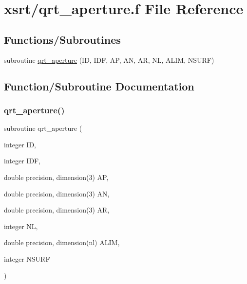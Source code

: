 \hypertarget{qrt__aperture_8f}{}\section{xsrt/qrt\+\_\+aperture.f File Reference}
\label{qrt__aperture_8f}
\subsection*{Functions/\+Subroutines}
\begin{DoxyCompactItemize}
\item 
subroutine \hyperlink{qrt__aperture_8f_ae89864e2a397bd30e4e68ee292796c3a}{qrt\+\_\+aperture} (ID, I\+DF, AP, AN, AR, NL, A\+L\+IM, N\+S\+U\+RF)
\end{DoxyCompactItemize}


\subsection{Function/\+Subroutine Documentation}
\mbox{\label{qrt__aperture_8f_ae89864e2a397bd30e4e68ee292796c3a}} 
\subsubsection{\texorpdfstring{qrt\+\_\+aperture()}{qrt\_aperture()}}
{\footnotesize\ttfamily subroutine qrt\+\_\+aperture (\begin{DoxyParamCaption}\item[{integer}]{ID,  }\item[{integer}]{I\+DF,  }\item[{double precision, dimension(3)}]{AP,  }\item[{double precision, dimension(3)}]{AN,  }\item[{double precision, dimension(3)}]{AR,  }\item[{integer}]{NL,  }\item[{double precision, dimension(nl)}]{A\+L\+IM,  }\item[{integer}]{N\+S\+U\+RF }\end{DoxyParamCaption})}

